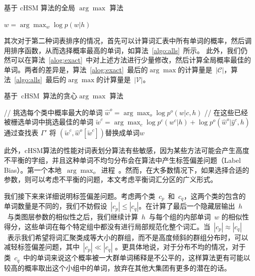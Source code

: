 \begin{algorithm}[!ht]
\caption{基于 cHSM 算法的全局 $\arg\max$ 算法}\label{algo:alls}
 {$w=\arg\max_w \log p(w|h)$}\;
\end{algorithm}

其次对于第二种词表排序的情况，首先可以计算词汇表中所有单词的概率，然后调用排序函数，从而选择概率最高的单词，如算法~\ref{algo:alls}~所示。 此外，我们仍然可以在算法~\ref{alog:exact}~中对上述方法进行少量修改，然后计算全局概率最佳的单词。两者的差异是，算法~\ref{alog:exact}~最后的$\arg\max$的计算量是~$\mathcal{|C|}$，算法~\ref{algo:alls}~最后的$\arg\max$的计算量是~$\mathcal{|V|}$。
\begin{algorithm}[!t]
\caption{基于~cHSM~算法的贪心$\arg\max$ 算法}\label{alog:exact}
{// 挑选每个类中概率最大的单词}\;
 {$\hat w^o=\arg\max_o{\log p^o(w| c,h)}$ }\;
 {// 在这些已经被栅选单词中挑选最佳的单词}
 {$\tilde w^c=\arg\max_c{\log p^c(w^c|h)+\log p^o(\hat w^o|\hat y^c,h)}$}\;
通过查找表 $\Gamma'$ 将 $(\tilde w^c,\hat w^o[\tilde w^c])$替换成单词$w$ \;
\end{algorithm}


此外，cHSM算法的性能对词表划分算法有些敏感，因为某些方法可能会产生高度不平衡的字组，并且这种单词不均匀分布会在算法中产生标签偏差问题（Label Bias）。第一个本地~$\arg\max_o$~进程~。然而，在大多数情况下，如果选择合适的参数，则可以考虑不平衡的问题，本文考虑平衡词汇分区的广义形式。

我们接下来来详细说明标签偏差问题。考虑两个类~$c_p$~和~$c_q$，这两个类的包含的单词数量是不同的，我们不妨假设~$|c_p|\le|c_q|$。在计算了最后一个隐藏层输出~$h$~与类图层参数的相似性之后，我们继续计算~$h$~与每个组的内部单词~$w$ 的相似性得分，这些单词在每个特定组中都没有进行局部规范化整个词汇。当~$|c_p|\approx|c_q|$~表示我们希望将词汇聚类成等大小的群组，而不是高度倾斜的群组分布时，可以减轻标签偏差问题，其中~$|c_p|\ll|c_q|$ 。更具体地说，对于分布不均的情况，对于类~$c_q$~中的单词来说这个概率被一大群单词稀释是不公平的，这样算法更有可能以较高的概率取出这个小组中的单词，放弃在其他大集团有更多的潜在的话。

